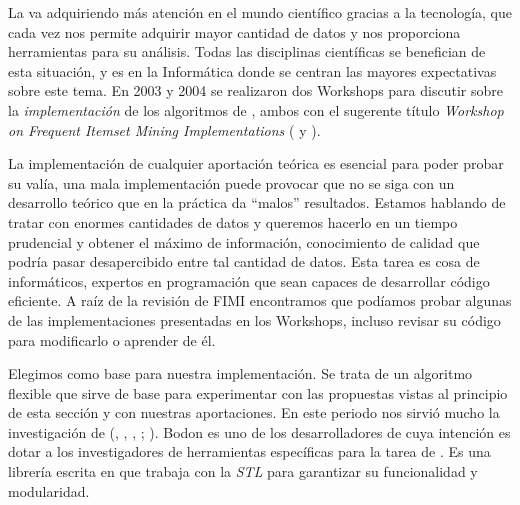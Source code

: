 La \arm va adquiriendo más atención en el mundo científico gracias a la tecnología, que cada vez nos permite adquirir mayor cantidad de datos y nos proporciona herramientas para su análisis. Todas las disciplinas científicas se benefician de esta situación, y es en la Informática donde se centran las mayores expectativas sobre este tema. En 2003 y 2004 se realizaron dos Workshops para discutir sobre la \emph{implementación} de los algoritmos de \FIM, ambos con el sugerente título \emph{Workshop on Frequent Itemset Mining Implementations} ( y ).

La implementación de cualquier aportación teórica es esencial para poder probar su valía, una mala implementación puede provocar que no se siga con un desarrollo teórico que en la práctica da "`malos"' resultados. Estamos hablando de tratar con enormes cantidades de datos y queremos hacerlo en un tiempo prudencial y obtener el máximo de información, conocimiento de calidad que podría pasar desapercibido entre tal cantidad de datos. Esta tarea es cosa de informáticos, expertos en programación que sean capaces de desarrollar código eficiente. A raíz de la revisión de FIMI encontramos que podíamos probar algunas de las implementaciones presentadas en los Workshops, incluso revisar su código para modificarlo o aprender de él.

Elegimos \apriori como base para nuestra implementación. Se trata de un algoritmo flexible que sirve de base para experimentar con las propuestas vistas al principio de esta sección y con nuestras aportaciones. En este periodo nos sirvió mucho la investigación de \citeauthor{Bodon-FastAprioriImplementation-2003} (\cite*{Bodon-FastAprioriImplementation-2003}, \cite*{Bodon-SurprisingResultsOfTrieBasedFIMAlgorithms-2004}, \cite*{Bodon-ATrieBasedAPRIORImplementationForMFISequences-2005},
\cite*{Bodon-ASurveyOnFrequentItemsetMining-2006}; \cite{RaczBodonSchmidt-BenchmarkingFIMAlgFromMeasurementToAnalysis-2005,}). Bodon es uno de los desarrolladores de  cuya intención es dotar a los investigadores de herramientas específicas para la tarea de \FIM. Es una librería escrita en \langCpp que trabaja con la \emph{STL} para garantizar su funcionalidad y modularidad.


